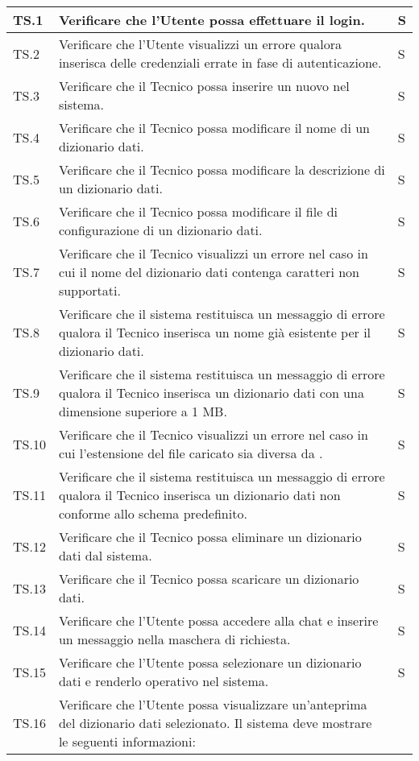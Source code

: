 \begin{adjustwidth}{-0.5cm}{-0.5cm}
\begin{longtable}{|P{1.5cm}|>{\raggedright}P{9.5cm}|>{\arraybackslash}P{1.5cm}|}
		TS.1 & Verificare che l'Utente possa effettuare il login. & S \\
		\hline TS.2 & Verificare che l'Utente visualizzi un errore qualora inserisca delle credenziali errate in fase di autenticazione. & S \\
		\hline TS.3 & Verificare che il Tecnico possa inserire un nuovo  nel sistema. & S \\ 
		\hline TS.4 & Verificare che il Tecnico possa modificare il nome di un dizionario dati. & S \\ 
		\hline TS.5 & Verificare che il Tecnico possa modificare la descrizione di un dizionario dati. & S \\
		\hline TS.6 & Verificare che il Tecnico possa modificare il file di configurazione di un dizionario dati. & S \\
		\hline TS.7 & Verificare che il Tecnico visualizzi un errore nel caso in cui il nome del dizionario dati contenga caratteri non supportati. & S \\ 
		\hline TS.8 & Verificare che il sistema restituisca un messaggio di errore qualora il Tecnico inserisca un nome già esistente per il dizionario dati. & S \\ 
		\hline TS.9 & Verificare che il sistema restituisca un messaggio di errore qualora il Tecnico inserisca un dizionario dati con una dimensione superiore a 1 MB. & S \\
		\hline TS.10 & Verificare che il Tecnico visualizzi un errore nel caso in cui l'estensione del file caricato sia diversa da . & S \\ 
		\hline TS.11 & Verificare che il sistema restituisca un messaggio di errore qualora il Tecnico inserisca un dizionario dati non conforme allo schema predefinito. & S \\  
		\hline TS.12 & Verificare che il Tecnico possa eliminare un dizionario dati dal sistema. & S \\   
		\hline TS.13 & Verificare che il Tecnico possa scaricare un dizionario dati. & S \\
		\hline TS.14 & Verificare che l'Utente possa accedere alla chat e inserire un messaggio nella maschera di richiesta. & S \\   
		\hline TS.15 & Verificare che l'Utente possa selezionare un dizionario dati e renderlo operativo nel sistema. & S \\ 
		\hline TS.16 & Verificare che l'Utente possa visualizzare un'anteprima del dizionario dati selezionato. Il sistema deve mostrare le seguenti informazioni:

\end{longtable}
\end{adjustwidth}
